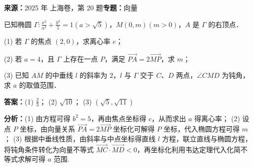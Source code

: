 \begin{question}[points=18]
\textbf{来源：}2025 年 上海卷，第 20 题\quad \textbf{专题：}向量\par
已知椭圆 $\Gamma: \frac{x^2}{a^2} + \frac{y^2}{5} = 1 (a > \sqrt{5})$，$M(0, m) (m > 0)$，$A$ 是 $\Gamma$ 的右顶点．

(1) 若 $\Gamma$ 的焦点 $(2,0)$，求离心率 $e$；

(2) 若 $a = 4$，且 $\Gamma$ 上存在一点 $P$，满足 $\overrightarrow{PA} = 2\overrightarrow{MP}$，求 $m$；

(3) 已知 $AM$ 的中垂线 $l$ 的斜率为 $2$，$l$ 与 $\Gamma$ 交于 $C$、$D$ 两点，$\angle CMD$ 为钝角，求 $a$ 的取值范围．
\begin{solution}
\textbf{答案：}(1) $\frac{2}{3}$； (2) $\sqrt{10}$； (3) $(\sqrt{5}, \sqrt{11})$

\textbf{分析：}(1) 由方程可得 $b^2 = 5$，再由焦点坐标得 $c$，从而求出 $a$ 得离心率； (2) 设点 $P$ 坐标，由向量关系 $\overrightarrow{PA} = 2\overrightarrow{MP}$ 坐标化可解得 $P$ 坐标，代入椭圆方程可得 $m$； (3) 根据中垂线性质，由斜率与中点坐标得直线 $l$ 方程，联立直线与椭圆方程，将钝角条件转化为向量不等式 $\overrightarrow{MC} \cdot \overrightarrow{MD} < 0$，再坐标化利用韦达定理代入化简不等式求解可得 $a$ 范围.


\end{solution}
\end{question}
